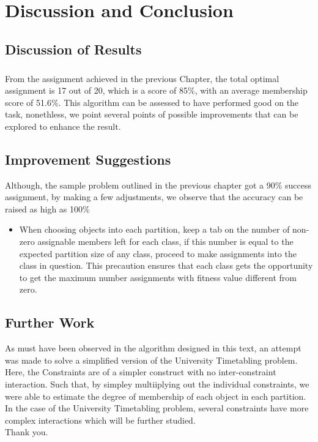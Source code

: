 \documentclass[a4paper,openany]{book}
\begin{document}
	\chapter{Discussion and Conclusion}
		\section{Discussion of Results}
			\paragraph{}
				From the assignment achieved in the previous Chapter, the total optimal assignment is 17 out of 20, which is a score of 85\%, with an average membership score of 51.6\%. This algorithm can be assessed to have performed good on the task, nonethless, we point several points of possible improvements that can be explored to enhance the result.
		\section{Improvement Suggestions}
			Although, the sample problem outlined in the previous chapter got a 90\% success assignment, by making a few adjustments, we observe that the accuracy can be raised as high as 100\%
			\begin{itemize}
				\item When choosing objects into each partition, keep a tab on the number of non-zero assignable members left for each class, if this number is equal to the expected partition size of any class, proceed to make assignments into the class in question. This precaution ensures that each class gets the opportunity to get the maximum number assignments with fitness value different from zero.
			\end{itemize}
		\section{Further Work}
			As must have been observed in the algorithm designed in this text, an attempt was made to solve a simplified version of the University Timetabling problem. Here, the Constraints are of a simpler construct with no inter-constraint interaction. Such that, by simpley multiiplying out the individual constraints, we were able to estimate the degree of membership of each object in each partition. In the case of the University Timetabling problem, several constraints have more complex interactions which will be further studied.\\
			Thank you.	
	\newpage
	
	
\end{document}
